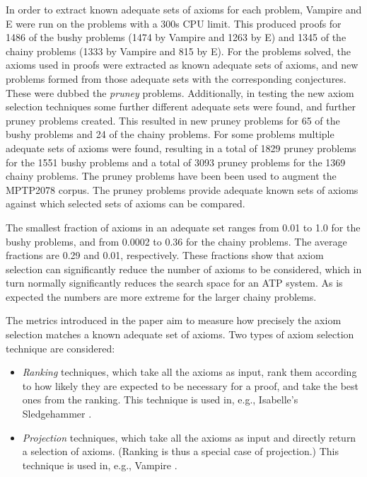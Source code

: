 \documentclass[EPiC]{easychair}
\begin{document}
In order to extract known adequate sets of axioms for each problem, Vampire
and E were run on the problems with a 300s CPU limit.
This produced proofs for 1486 of the bushy problems (1474 by Vampire and 1263
by E) and 1345 of the chainy problems (1333 by Vampire and 815 by E).
For the problems solved, the axioms used in proofs were extracted as
known adequate sets of axioms, and new problems formed from those adequate
sets with the corresponding conjectures.
These were dubbed the \emph{pruney} problems.
Additionally, in testing the new axiom selection techniques some further
different adequate sets were found, and further pruney problems created.
This resulted in new pruney problems for 65 of the bushy problems and
24 of the chainy problems.
For some problems multiple adequate sets of axioms were found, resulting in
a total of 1829 pruney problems for the 1551 bushy problems and a total of
3093 pruney problems for the 1369 chainy problems.
The pruney problems have been been used to augment the MPTP2078 corpus.
The pruney problems provide adequate known sets of axioms against which
selected sets of axioms can be compared.

The smallest fraction of axioms in an adequate set ranges from 0.01 to 1.0
for the bushy problems, and from 0.0002 to 0.36 for the chainy problems.
The average fractions are 0.29 and 0.01, respectively.
These fractions show that axiom selection can significantly reduce the
number of axioms to be considered, which in turn normally significantly
reduces the search space for an ATP system.
As is expected the numbers are more extreme for the larger chainy problems.

The metrics introduced in the paper aim to measure how precisely the
axiom selection matches a known adequate set of axioms.
Two types of axiom selection technique are considered:
\begin{itemize}
\item \emph{Ranking} techniques, which take all the axioms as input, rank them
      according to how likely they are expected to be necessary for a proof,
      and take the best ones from the ranking.
      This technique is used in, e.g., Isabelle's Sledgehammer \cite{PB10}.
\item \emph{Projection} techniques, which take all the axioms as input and
      directly return a selection of axioms.
      (Ranking is thus a special case of projection.)
      This technique is used in, e.g., Vampire \cite{HV11}.
\end{itemize}
\end{document}
